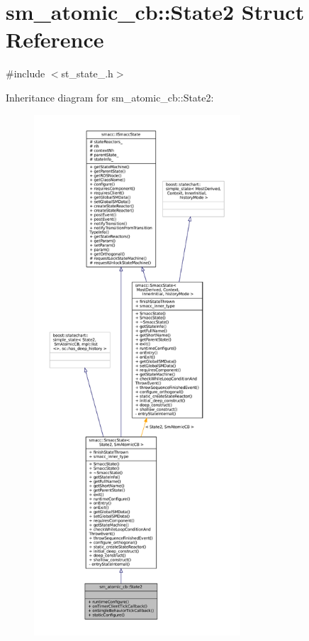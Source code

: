 \hypertarget{structsm__atomic__cb_1_1State2}{}\section{sm\+\_\+atomic\+\_\+cb\+:\+:State2 Struct Reference}
\label{structsm__atomic__cb_1_1State2}


{\ttfamily \#include $<$st\+\_\+state\+\_.\+h$>$}



Inheritance diagram for sm\+\_\+atomic\+\_\+cb\+:\+:State2\+:
\nopagebreak
\begin{figure}[H]
\begin{center}
\leavevmode
\includegraphics[height=550pt]{structsm__atomic__cb_1_1State2__inherit__graph}
\end{center}
\end{figure}


